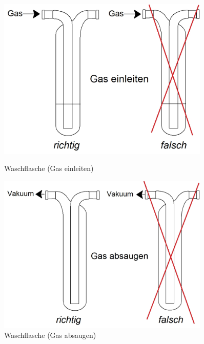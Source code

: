 \begin{figure}[h!]
	\begin{minipage}[t]{0.49\textwidth}
		\vspace{0pt}
		\centering
		\includegraphics[width=0.9\textwidth]{img/Waschflasche (Gas einleiten).jpg}
		\caption{Waschflasche (Gas einleiten)}
		\label{fig:Waschflasche_ein}
	\end{minipage}
	\hfill
	\hspace{2mm}
	\begin{minipage}[t]{0.49\textwidth}
		\vspace{0pt}
	\centering
	\includegraphics[width=0.9\textwidth]{img/Waschflasche (Gas absaugen).jpg}
	\caption{Waschflasche (Gas absaugen)}
	\label{fig:Waschflasche_aus}
	\end{minipage}
\end{figure}
\FloatBarrier

